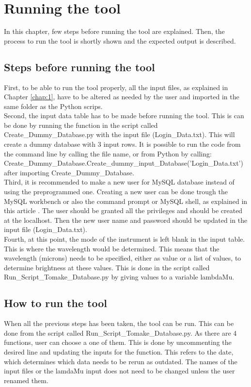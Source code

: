 \chapter{Running the tool}
\label{chap:3}

In this chapter, few steps before running the tool are explained. Then, the process to run the tool is shortly shown and the expected output is described.

\section{Steps before running the tool}
First, to be able to run the tool properly, all the input files, as explained in Chapter \ref{chap:1}, have to be altered as needed by the user and imported in the same folder as the Python scrips. \\

Second, the input data table has to be made before running the tool. This is can be done by running the function in the script called Create\_Dummy\_Database.py with the input file (Login\_Data.txt). This will create a dummy database with 3 input rows. It is possible to run the code from the command line by calling the file name, or from Python by calling: \\ Create\_Dummy\_Database.Create\_dummy\_input\_Database('Login\_Data.txt')\\ after importing Create\_Dummy\_Database. \\

Third, it is recommended to make a new user for MySQL database instead of using the preprogrammed one. Creating a new user can be done trough the MySQL workbench or also the command prompt or MySQL shell, as explained in this article \cite{user}. The user should be granted all the privileges and should be created at the localhost. Then the new user name and password should be updated in the input file (Login\_Data.txt).\\

Fourth, at this point, the mode of the instrument is left blank in the input table. This is where the wavelength would be determined. This means that the wavelength (microns) needs to be specified, either as value or a list of values, to determine brightness at these values. This is done in the script called Run\_Script\_Tomake\_Database.py by giving values to a variable lambdaMu.



\section{How to run the tool}
When all the previous steps has been taken, the tool can be run. This can be done from the script called Run\_Script\_Tomake\_Database.py. As there are 4 functions, user can choose a one of them. This is done by uncommenting the desired line and updating the inputs for the function. This refers to the date, which determines which data needs to be rerun as outdated. The names of the input files or the lamdaMu input does not need to be changed unless the user renamed them. 

